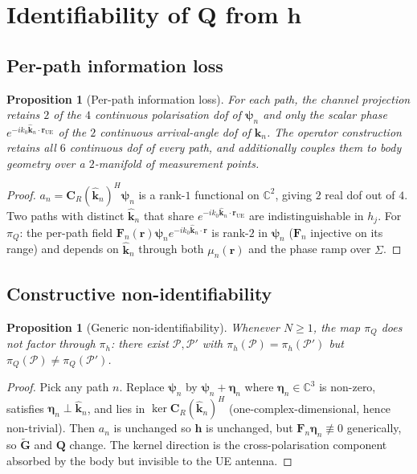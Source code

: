 \documentclass[11pt,a4paper]{article}
\newtheorem{proposition}[theorem]{Proposition}
\theoremstyle{definition}
\newcommand{\rr}{\mathbf{r}}
\newcommand{\hh}{\mathbf{h}}
\newcommand{\kh}{\hat{\mathbf{k}}}
\newcommand{\Q}{\mathbf{Q}}
\newcommand{\Gt}{\widetilde{\mathbf{G}}}
\newcommand{\F}{\mathbf{F}}
\newcommand{\Cp}{\mathbf{C}}
\newcommand{\psib}{\boldsymbol{\psi}}
\newcommand{\Sigmaset}{\Sigma}
\newcommand{\C}{\mathbb{C}}
\begin{document}
\section{Identifiability of \texorpdfstring{$\Q$}{Q} from \texorpdfstring{$\hh$}{h}}
\label{sec:identifiability}

\subsection{Per-path information loss}

\begin{proposition}[Per-path information loss]
\label{prop:per-path-loss}
For each path, the channel projection retains $2$ of the $4$
continuous polarisation dof of $\psib_n$ and only the scalar phase
$e^{-ik_0\kh_n\cdot\rr_{\mathrm{UE}}}$ of the $2$ continuous arrival-angle
dof of $\kh_n$. The operator construction retains all $6$ continuous
dof of every path, and additionally couples them to body geometry over
a $2$-manifold of measurement points.
\end{proposition}

\begin{proof}
$a_n=\Cp_R(\kh_n)^H\psib_n$ is a rank-$1$ functional on $\C^2$, giving
$2$ real dof out of $4$. Two paths with distinct $\kh_n$ that share
$e^{-ik_0\kh_n\cdot\rr_{\mathrm{UE}}}$ are indistinguishable in $h_j$.
For $\pi_Q$: the per-path field
$\F_n(\rr)\psib_n e^{-ik_0\kh_n\cdot\rr}$ is rank-$2$ in $\psib_n$
($\F_n$ injective on its range) and depends on $\kh_n$ through both
$\mu_n(\rr)$ and the phase ramp over $\Sigmaset$.
\end{proof}

\subsection{Constructive non-identifiability}

\begin{proposition}[Generic non-identifiability]
\label{prop:non-id}
Whenever $N\ge 1$, the map $\pi_Q$ does not factor through $\pi_h$:
there exist $\mathcal{P},\mathcal{P}'$ with
$\pi_h(\mathcal{P})=\pi_h(\mathcal{P}')$ but
$\pi_Q(\mathcal{P})\ne\pi_Q(\mathcal{P}')$.
\end{proposition}

\begin{proof}
Pick any path $n$. Replace $\psib_n$ by $\psib_n+\boldsymbol\eta_n$ where
$\boldsymbol\eta_n\in\C^3$ is non-zero, satisfies
$\boldsymbol\eta_n\perp\kh_n$, and lies in
$\ker\Cp_R(\kh_n)^H$ (one-complex-dimensional, hence non-trivial).
Then $a_n$ is unchanged so $\hh$ is unchanged, but
$\F_n\boldsymbol\eta_n\not\equiv 0$ generically, so $\Gt$ and $\Q$
change. The kernel direction is the cross-polarisation component
absorbed by the body but invisible to the UE antenna.
\end{proof}
\end{document}
